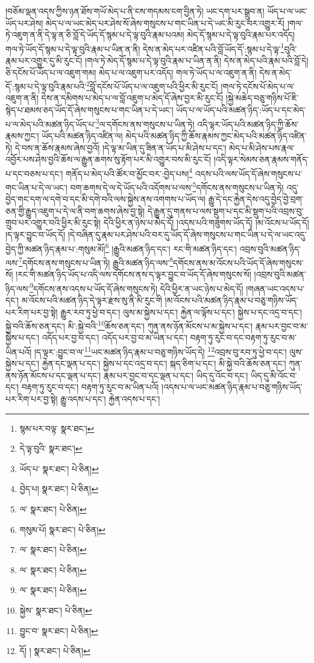 །བཅོམ་ལྡན་འདས་ཀྱིས་ཉན་ཐོས་གཡོ་མེད་པ་ནི་ངས་གདམས་ངག་བྱིན་ཏེ། ཡང་དག་པར་སྒྲུབ་ན། ཡོད་པ་ལ་ཡང་ཡོད་པར་ཤེས། མེད་པ་ལ་ཡང་མེད་པར་ཤེས་སོ་ཞེས་གསུངས་པ་གང་ཡིན་པ་དེ་ཡང་མི་རུང་བར་འགྱུར་རོ། །གལ་ཏེ་འཇུག་ན་ནི་དེ་ལྟ་ན་ཅི་བློ་དེ་ཡོད་དོ་སྙམ་པ་དེ་ལྟ་བུའི་རྣམ་པའམ། མེད་དོ་སྙམ་པ་དེ་ལྟ་བུའི་རྣམ་པར་འདོད། གལ་ཏེ་ཡོད་དོ་སྙམ་པ་དེ་ལྟ་བུའི་རྣམ་པ་ཡིན་ན་ནི། དེས་ན་མེད་པར་འཛིན་པའི་བློ་ཡོད་དོ་:སྙམ་པ་དེ་ལྟ་\footnote{སྙམ་པར་བལྟ་  སྣར་ཐང་། }བུའི་རྣམ་པར་འགྱུར་དུ་མི་རུང་ངོ། །གལ་ཏེ་མེད་དོ་སྙམ་པ་དེ་ལྟ་བུའི་རྣམ་པ་ཡིན་ན་ནི། དེས་ན་མེད་པའི་རྣམ་པའི་བློ་དེ། ཅི་དངོས་པོ་ཡོད་པ་ལ་འཇུག་གམ། མེད་པ་ལ་འཇུག་པར་འདོད། གལ་ཏེ་ཡོད་པ་ལ་འཇུག་ན་ནི། དེས་ན་མེད་དོ་:སྙམ་པ་དེ་ལྟ་བུའི་རྣམ་པའི་\footnote{དེ་ལྟ་བུའི་  སྣར་ཐང་། }བློ་དངོས་པོ་ཡོད་པ་ལ་འཇུག་པའི་ཕྱིར་མི་རུང་ངོ། །གལ་ཏེ་དངོས་པོ་མེད་པ་ལ་འཇུག་ན་ནི། དེས་ན་དམིགས་པ་མེད་པ་ལ་བློ་འཇུག་པ་མེད་དོ་ཞེས་བྱར་མི་རུང་ངོ། །སྐྱེ་མཆེད་བཅུ་གཉིས་པོ་ཇི་སྙེད་པ་ཐམས་ཅད་ཡོད་དོ་ཞེས་གསུངས་པ་གང་ཡིན་པ་དེ་ཡང་། ཡོད་པ་ལ་ཡོད་པའི་མཚན་ཉིད་:ཡོད་པ་དང་མེད་པ་ལ་མེད་པའི་མཚན་ཉིད་ཡོད་པ་\footnote{ཡོད་པ་  སྣར་ཐང་།  པེ་ཅིན། }ལ་དགོངས་ནས་གསུངས་པ་ཡིན་ཏེ། འདི་ལྟར་ཡོད་པའི་མཚན་ཉིད་ཀྱི་ཆོས་རྣམས་ཀྱང་། ཡོད་པའི་མཚན་ཉིད་འཛིན་ལ། མེད་པའི་མཚན་ཉིད་ཀྱི་ཆོས་རྣམས་ཀྱང་མེད་པའི་མཚན་ཉིད་འཛིན་ཏེ། དེ་བས་ན་ཆོས་རྣམས་ཞེས་བྱའོ། །དེ་ལྟ་མ་ཡིན་དུ་ཟིན་ན་ཡོད་པ་མི་ཤེས་པ་དང་། མེད་པ་མི་ཤེས་པས་རྣལ་འབྱོར་པས་ཤེས་བྱའི་ཆོས་ལ་རྒྱུན་ཆགས་སུ་རྟོག་པར་མི་འགྱུར་བས་མི་རུང་ངོ། །འདི་ལྟར་སེམས་ཅན་རྣམས་གནོད་པ་དང་བཅས་པ་དང་། གནོད་པ་མེད་པའི་ཚོར་བ་མྱོང་བར་:བྱེད་པས།\footnote{བྱེད་པ།  སྣར་ཐང་།  པེ་ཅིན། } འདས་པའི་ལས་ཡོད་དོ་ཞེས་གསུངས་པ་གང་ཡིན་པ་དེ་ལ་ཡང་། བག་ཆགས་དེ་ལ་དེ་ཡོད་པའི་འདོགས་པ་ལས་\footnote{ལ་  སྣར་ཐང་།  པེ་ཅིན། }དགོངས་ནས་གསུངས་པ་ཡིན་ཏེ། འདུ་བྱེད་གང་དག་ལ་དགེ་བ་དང་མི་དགེ་བའི་ལས་སྐྱེས་ནས་འགགས་པ་ཡོད་ལ། རྒྱུ་དེ་དང་རྐྱེན་དེས་འདུ་བྱེད་བྱེ་བྲག་ཅན་གྱི་རྒྱུད་འཇུག་པ་དེ་ལ་ནི་བག་ཆགས་ཞེས་བྱ་སྟེ། དེ་རྒྱུན་དུ་གནས་པ་ལས་སྡུག་པ་དང་མི་སྡུག་པའི་འབྲས་བུ་གྲུབ་པར་འགྱུར་བའི་ཕྱིར་མི་རུང་སྟེ། དེའི་ཕྱིར་ན་ཉེས་པ་མེད་དོ། །འདས་པའི་གཟུགས་ཡོད་དོ། །མ་འོངས་པ་ཡོད་དོ། །ད་ལྟར་བྱུང་བ་ཡོད་དོ། །དེ་བཞིན་དུ་རྣམ་པར་ཤེས་པའི་བར་དུ་ཡོད་དོ་ཞེས་གསུངས་པ་གང་ཡིན་པ་དེ་ལ་ཡང་འདུ་བྱེད་ཀྱི་མཚན་ཉིད་རྣམ་པ་:གསུམ་མོ།\footnote{གསུམ་པོ།  སྣར་ཐང་།  པེ་ཅིན། } །རྒྱུའི་མཚན་ཉིད་དང་། རང་གི་མཚན་ཉིད་དང་། འབྲས་བུའི་མཚན་ཉིད་ལས་\footnote{ལ་  སྣར་ཐང་།  པེ་ཅིན། }དགོངས་ནས་གསུངས་པ་ཡིན་ཏེ། རྒྱུའི་མཚན་ཉིད་ལས་\footnote{ལ་  སྣར་ཐང་།  པེ་ཅིན། }དགོངས་ནས་མ་འོངས་པའི་ཡོད་དོ་ཞེས་གསུངས་སོ། །རང་གི་མཚན་ཉིད་ཡོད་པ་འདི་ལས་དགོངས་ནས་ད་ལྟར་བྱུང་བ་ཡོད་དོ་ཞེས་གསུངས་སོ། །འབྲས་བུའི་མཚན་ཉིད་ལས་\footnote{ལ་  སྣར་ཐང་།  པེ་ཅིན། }དགོངས་ནས་འདས་པ་ཡོད་དོ་ཞེས་གསུངས་ཏེ། དེའི་ཕྱིར་ན་ཡང་ཉེས་པ་མེད་དོ། །གཞན་ཡང་འདས་པ་དང་། མ་འོངས་པའི་མཚན་ཉིད་དེ་ལྟར་རྫས་སུ་ནི་མི་རུང་གི །མ་འོངས་པའི་མཚན་ཉིད་རྣམ་པ་བཅུ་གཉིས་ཡོད་པར་རིག་པར་བྱ་སྟེ། རྒྱུར་རབ་ཏུ་ཕྱེ་བ་དང་། ལུས་མ་སྐྱེས་པ་དང་། རྐྱེན་ལ་ལྟོས་པ་དང་། སྐྱེས་པ་དང་འདྲ་བ་དང་། སྐྱེ་བའི་ཆོས་ཅན་དང་། མི་:སྐྱེ་བའི་\footnote{སྐྱེས་  སྣར་ཐང་།  པེ་ཅིན། }ཆོས་ཅན་དང་། ཀུན་ནས་ཉོན་མོངས་པ་མ་སྐྱེས་པ་དང་། རྣམ་པར་བྱང་བ་མ་སྐྱེས་པ་དང་། འདོད་པར་བྱ་བ་དང་། འདོད་པར་བྱ་བ་མ་ཡིན་པ་དང་། བརྟག་ཏུ་རུང་བ་དང་བརྟག་ཏུ་རུང་བ་མ་ཡིན་པའོ། །ད་ལྟར་:བྱུང་བ་ལ་\footnote{བྱུང་བ་  སྣར་ཐང་།  པེ་ཅིན། }ཡང་མཚན་ཉིད་རྣམ་པ་བཅུ་གཉིས་ཡོད་དེ། \footnote{དོ། །   སྣར་ཐང་།  པེ་ཅིན། }འབྲས་བུ་རབ་ཏུ་ཕྱེ་བ་དང་། ལུས་སྐྱེས་པ་དང་། རྐྱེན་དང་ལྡན་པ་དང་། སྐྱེས་པ་དང་འདྲ་བ་དང་། སྐད་ཅིག་པ་དང་། མི་སྐྱེ་བའི་ཆོས་ཅན་དང་། ཀུན་ནས་ཉོན་མོངས་པ་དང་ལྡན་པ་དང་། རྣམ་པར་བྱང་བ་དང་ལྡན་པ་དང་། ཡིད་དུ་འོང་བ་དང་། ཡིད་དུ་མི་འོང་བ་དང་། བརྟག་ཏུ་རུང་བ་དང་། བརྟག་ཏུ་རུང་བ་མ་ཡིན་པའོ། །འདས་པ་ལ་ཡང་མཚན་ཉིད་རྣམ་པ་བཅུ་གཉིས་ཡོད་པར་རིག་པར་བྱ་སྟེ། རྒྱུ་འདས་པ་དང་། རྐྱེན་འདས་པ་དང་། 